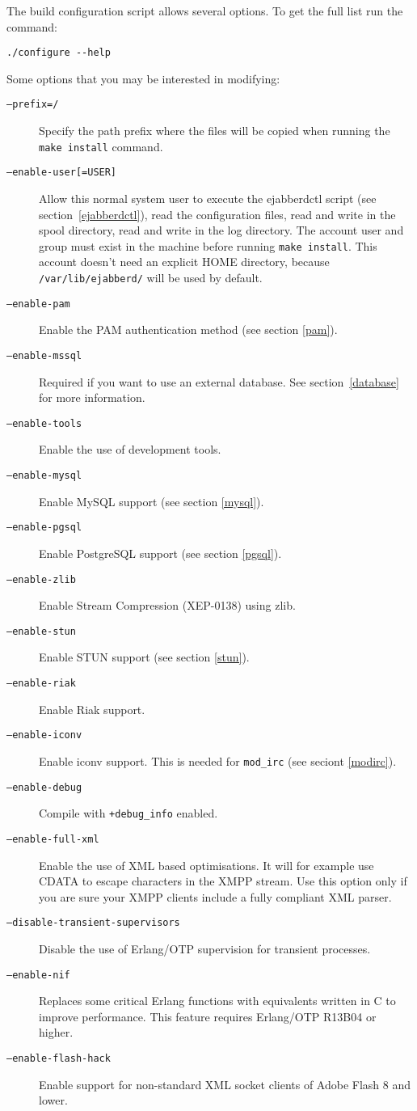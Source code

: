 \documentclass[a4paper,10pt]{book}
\newcommand{\bracehack}{\def\{{\char"7B}\def\}{\char"7D}}
\newcommand{\titem}[1]{\item[\bracehack\texttt{#1}]}
\newcommand{\term}[1]{\texttt{#1}}
\begin{document}
The build configuration script allows several options.
To get the full list run the command:
\begin{verbatim}
./configure --help
\end{verbatim}

Some options that you may be interested in modifying:
\begin{description}
	\titem{--prefix=/}
	Specify the path prefix where the files will be copied when running
	the \term{make install} command.

	\titem{--enable-user[=USER]}
	Allow this normal system user to execute the ejabberdctl script
	(see section~\ref{ejabberdctl}),
	read the configuration files,
	read and write in the spool directory,
	read and write in the log directory.
	The account user and group must exist in the machine
	before running \term{make install}.
	This account doesn't need an explicit HOME directory, because
	\term{/var/lib/ejabberd/} will be used by default.

	\titem{--enable-pam}
	Enable the PAM authentication method (see section \ref{pam}).

	\titem{--enable-mssql}
	Required if you want to use an external database.
	See section~\ref{database} for more information.

        \titem{--enable-tools}
        Enable the use of development tools.

        \titem{--enable-mysql}
        Enable MySQL support (see section \ref{mysql}).

        \titem{--enable-pgsql}
        Enable PostgreSQL support (see section \ref{pgsql}).

        \titem{--enable-zlib}
        Enable Stream Compression (XEP-0138) using zlib.

        \titem{--enable-stun}
        Enable STUN support (see section \ref{stun}).

        \titem{--enable-riak}
        Enable Riak support.

        \titem{--enable-iconv}
        Enable iconv support. This is needed for \term{mod\_irc} (see seciont \ref{modirc}).

        \titem{--enable-debug}
        Compile with \term{+debug\_info} enabled.

	\titem{--enable-full-xml}
	Enable the use of XML based optimisations.
	It will for example use CDATA to escape characters in the XMPP stream.
	Use this option only if you are sure your XMPP clients include a fully compliant XML parser.

	\titem{--disable-transient-supervisors}
	Disable the use of Erlang/OTP supervision for transient processes.

	\titem{--enable-nif}
        Replaces some critical Erlang functions with equivalents written in C to improve performance.
        This feature requires Erlang/OTP R13B04 or higher.

	\titem{--enable-flash-hack}
	Enable support for non-standard XML socket clients of Adobe Flash 8 and lower.
\end{description}
\end{document}
